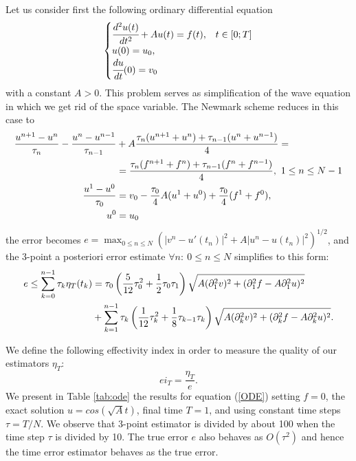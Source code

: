 \documentclass{imanum}
\begin{document}
Let us consider first the following ordinary differential equation
\begin{equation}
\begin{cases}
\cfrac{d^{2}u(t)}{dt^{2}}+Au(t)=f(t) ,&t\in\left[ 0;T\right]\\
u(0)=u_0 ,&\\
\cfrac{du}{dt}(0)=v_0&
\end{cases}
\label{ODE}
\end{equation}
with a constant $A>0$. This problem serves as simplification of the wave equation in which we get rid of the space variable. The Newmark scheme reduces in this case to
\begin{align}
\frac{u^{n+1}-u^{n}}{\tau_n}-\frac{u^{n}-u^{n-1}}{\tau_{n-1}}&+A\frac{\tau_n(u^{n+1}+u^{n})+\tau_{n-1}(u^{n}+u^{n-1})}{4}=
\notag\\
&=\frac{\tau_n (f^{n+1}+f^n)+\tau_{n-1}(f^n+f^{n-1})}{4},~1\leq n\leq N-1
\label{schN}\\
\frac{u^1-u^0}{\tau_0}&=v_0-\frac{\tau_0}{4}A(u^1+u^0)+\frac{\tau_0}{4}(f^1+f^0),
\notag\\
u^0&=u_0\notag
\end{align}
the error becomes $e=\displaystyle\max_{0 \leq n \leq N}\left( \left\vert v^{n}-{u}'(t_{n})\right\vert ^{2}+A\left\vert u^{n}-u(t_{n})\right\vert ^{2}\right) ^{{1}/{2}}$, and the 3-point a posteriori error estimate $\forall n:~0\leq n \leq N$ simplifies to this form:
\begin{align}\label{errest}
e \leq \sum_{k=0}^{n-1}\tau_k\eta_{T}(t_k)&= \tau_0 \left(\frac{5}{12}\tau_{0}^2+\frac{1}{2}\tau_{0}\tau_{1}\right) \sqrt{A(\partial_1^2 v)^2 +  (\partial_1^2f-A\partial_1^2 u)^2}\\
\notag   &+\sum_{k=1}^{n-1}\tau_k \left(\frac{1}{12}\tau_{k}^2+\frac{1}{8}\tau_{k-1}\tau_{k}\right) \sqrt{A(\partial_k^2 v)^2 +  (\partial_k^2f-A\partial_k^2 u)^2}.
\end{align}

We define the following effectivity index  in order to measure the quality of our estimators $\eta_T$:
\begin{equation*}
ei_T=\frac{\eta_T}{e}.
\end{equation*}
We present in Table \ref{tab:ode} the results for equation (\ref{ODE}) setting $f=0$, the exact solution $u=cos(\sqrt{A}t)$, final time $T=1$, and using constant time steps $\tau=\displaystyle {T}/{N}$. We observe that 3-point estimator is divided by about 100 when the time step $\tau$ is divided by 10. The true error $e$ also behaves as $O(\tau^2)$ and hence the time error estimator behaves as the true error.
\end{document}
